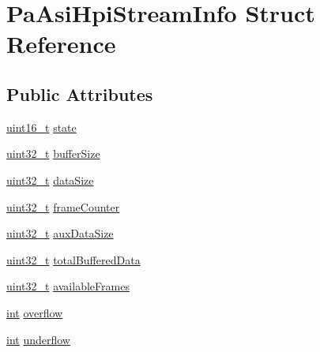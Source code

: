 \hypertarget{struct_pa_asi_hpi_stream_info}{}\section{Pa\+Asi\+Hpi\+Stream\+Info Struct Reference}
\label{struct_pa_asi_hpi_stream_info}
\subsection*{Public Attributes}
\begin{DoxyCompactItemize}
\item 
\hyperlink{lib-src_2ffmpeg_2win32_2stdint_8h_a30af71eaf40c925c9832eb289a48da35}{uint16\+\_\+t} \hyperlink{struct_pa_asi_hpi_stream_info_ab9516c3e7be528304c1829cb086c0ba5}{state}
\item 
\hyperlink{lib-src_2ffmpeg_2win32_2stdint_8h_a6eb1e68cc391dd753bc8ce896dbb8315}{uint32\+\_\+t} \hyperlink{struct_pa_asi_hpi_stream_info_ad112f86fb1b2839cbc0e87bfd8616489}{buffer\+Size}
\item 
\hyperlink{lib-src_2ffmpeg_2win32_2stdint_8h_a6eb1e68cc391dd753bc8ce896dbb8315}{uint32\+\_\+t} \hyperlink{struct_pa_asi_hpi_stream_info_a5cb756961bf1871b845084759b4bfd0d}{data\+Size}
\item 
\hyperlink{lib-src_2ffmpeg_2win32_2stdint_8h_a6eb1e68cc391dd753bc8ce896dbb8315}{uint32\+\_\+t} \hyperlink{struct_pa_asi_hpi_stream_info_a254075498024c75871b01557c010d9cb}{frame\+Counter}
\item 
\hyperlink{lib-src_2ffmpeg_2win32_2stdint_8h_a6eb1e68cc391dd753bc8ce896dbb8315}{uint32\+\_\+t} \hyperlink{struct_pa_asi_hpi_stream_info_acbb424b6faff235b6c04e237fdba002b}{aux\+Data\+Size}
\item 
\hyperlink{lib-src_2ffmpeg_2win32_2stdint_8h_a6eb1e68cc391dd753bc8ce896dbb8315}{uint32\+\_\+t} \hyperlink{struct_pa_asi_hpi_stream_info_a573171e6d7e38fa204f0827638a09d1d}{total\+Buffered\+Data}
\item 
\hyperlink{lib-src_2ffmpeg_2win32_2stdint_8h_a6eb1e68cc391dd753bc8ce896dbb8315}{uint32\+\_\+t} \hyperlink{struct_pa_asi_hpi_stream_info_aa237530f1e9ee1378e573634fec3ce37}{available\+Frames}
\item 
\hyperlink{xmltok_8h_a5a0d4a5641ce434f1d23533f2b2e6653}{int} \hyperlink{struct_pa_asi_hpi_stream_info_aab85a5b0d14b9f58ada42c0043a6f7f9}{overflow}
\item 
\hyperlink{xmltok_8h_a5a0d4a5641ce434f1d23533f2b2e6653}{int} \hyperlink{struct_pa_asi_hpi_stream_info_af7f47c3fa22d947baddb6d6bfc551963}{underflow}
\end{DoxyCompactItemize}


